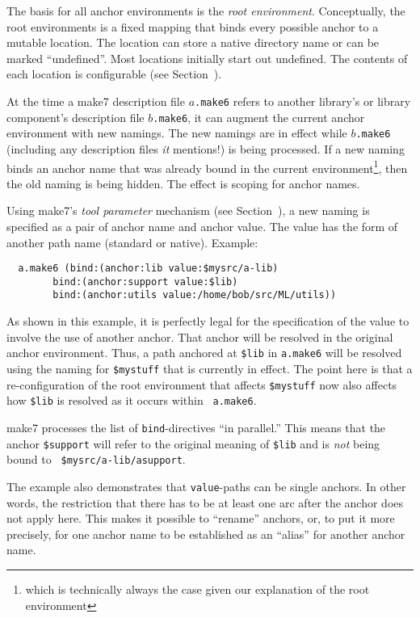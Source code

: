 The basis for all anchor environments is the {\em root environment}.
Conceptually, the root environments is a fixed mapping that binds
every possible anchor to a mutable location.  The location can store a
native directory name or can be marked ``undefined''.  Most locations
initially start out undefined.  The contents of each location is
configurable (see Section~).

At the time a make7 description file $a${\tt .make6} refers to another
library's or library component's description file $b${\tt .make6}, it can
augment the current anchor environment with new namings.  The new
namings are in effect while $b${\tt .make6} (including any description
files {\it it}\/ mentions!) is being processed.  If a new naming
binds an anchor name that was already bound in the current
environment\footnote{which is technically always the case given our
explanation of the root environment}, then the old naming is being
hidden.  The effect is scoping for anchor names.

Using make7's {\em tool parameter} mechanism (see
Section~), a new naming is specified as a pair of
anchor name and anchor value.  The value has the form of another path
name (standard or native). Example:

\begin{verbatim}
  a.make6 (bind:(anchor:lib value:$mysrc/a-lib)
        bind:(anchor:support value:$lib)
        bind:(anchor:utils value:/home/bob/src/ML/utils))
\end{verbatim}

As shown in this example, it is perfectly legal for the specification
of the value to involve the use of another anchor.  That anchor will
be resolved in the original anchor environment. Thus, a path anchored
at {\tt \$lib} in {\tt a.make6} will be resolved using the naming for
{\tt \$mystuff} that is currently in effect.  The point here is that a
re-configuration of the root environment that affects {\tt \$mystuff}
now also affects how {\tt \$lib} is resolved as it occurs within {\tt
a.make6}.

make7 processes the list of {\tt bind}-directives ``in parallel.'' This
means that the anchor {\tt \$support} will refer to the original
meaning of {\tt \$lib} and is {\em not} being bound to {\tt
\$mysrc/a-lib/asupport}.

The example also demonstrates that {\tt value}-paths can be single
anchors. In other words, the restriction that there has to be at least
one arc after the anchor does not apply here. This makes it possible
to ``rename'' anchors, or, to put it more precisely, for one anchor
name to be established as an ``alias'' for another anchor name.

